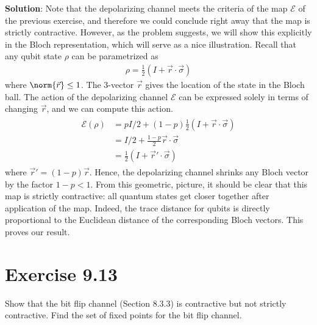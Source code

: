 \documentclass{book}
\newcommand{\mc}[1]{\mathcal{#1}}
\begin{document}
    \textbf{Solution}: Note that the depolarizing channel meets the criteria of the map $\mc{E}$ of the previous exercise, and therefore we could conclude right away that the map is strictly contractive. However, as the problem suggests, we will show this explicitly in the Bloch representation, which will serve as a nice illustration. Recall that any qubit state $\rho$ can be parametrized as 
    \begin{align}
        \rho = \frac{1}{2}(I+\Vec{r}\cdot\vec{\sigma})
    \end{align}
    where $\norm{\vec{r}} \leq 1$. The 3-vector $\vec{r}$ gives the location of the state in the Bloch ball. The action of the depolarizing channel $\mc{E}$ can be expressed solely in terms of changing $\vec{r}$, and we can compute this action.
    \begin{align}
    \begin{aligned}
        \mc{E}(\rho) &= pI/2 + (1-p)\frac{1}{2}(I+\vec{r}\cdot\vec{\sigma}) \\
        &= I/2 + \frac{1-p}{2}\vec{r}\cdot\vec{\sigma}\\
        &= \frac{1}{2}(I+\vec{r}'\cdot\vec{\sigma})
    \end{aligned}
    \end{align}
    where $\vec{r}' = (1-p) \vec{r}$. Hence, the depolarizing channel shrinks any Bloch vector by the factor $1-p<1$. From this geometric, picture, it should be clear that this map is strictly contractive: all quantum states get closer together after application of the map. Indeed, the trace distance for qubits is directly proportional to the Euclidean distance of the corresponding Bloch vectors. This proves our result. 
    
\section*{Exercise 9.13}
    Show that the bit flip channel (Section 8.3.3) is contractive but not strictly contractive. Find the set of fixed points for the bit flip channel.
    
\end{document}
